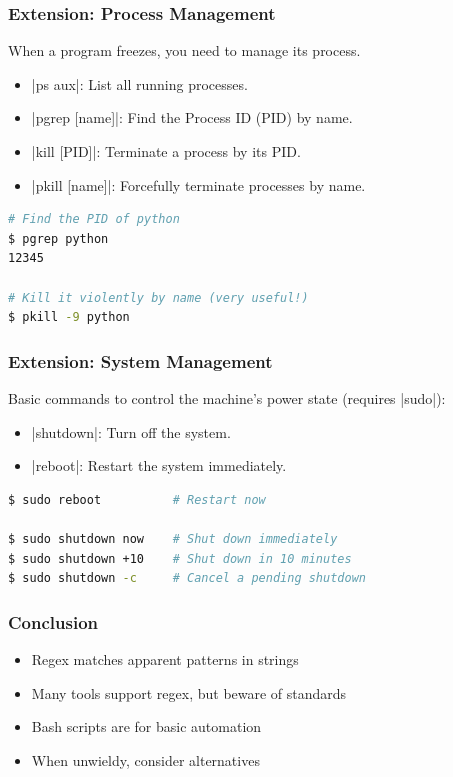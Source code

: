\begin{frame}[fragile]
\frametitle{Extension: Process Management}
When a program freezes, you need to manage its process.
\begin{itemize}
    \item \cverb|ps aux|: List all running processes.
    \item \cverb|pgrep [name]|: Find the Process ID (PID) by name.
    \item \cverb|kill [PID]|: Terminate a process by its PID.
    \item \cverb|pkill [name]|: Forcefully terminate processes by name.
\end{itemize}

\begin{lstlisting}[language=bash]
# Find the PID of python
$ pgrep python
12345

# Kill it violently by name (very useful!)
$ pkill -9 python
\end{lstlisting}
\end{frame}

\begin{frame}[fragile]
\frametitle{Extension: System Management}
Basic commands to control the machine's power state (requires \cverb|sudo|):
\begin{itemize}
    \item \cverb|shutdown|: Turn off the system.
    \item \cverb|reboot|: Restart the system immediately.
\end{itemize}

\begin{lstlisting}[language=bash]
$ sudo reboot          # Restart now

$ sudo shutdown now    # Shut down immediately
$ sudo shutdown +10    # Shut down in 10 minutes
$ sudo shutdown -c     # Cancel a pending shutdown
\end{lstlisting}
\end{frame}

\begin{frame}
\frametitle{Conclusion}
\begin{itemize}
    \item Regex matches apparent patterns in strings
    \item Many tools support regex, but beware of standards
    \item Bash scripts are for basic automation
    \item When unwieldy, consider alternatives
\end{itemize}
\end{frame}
